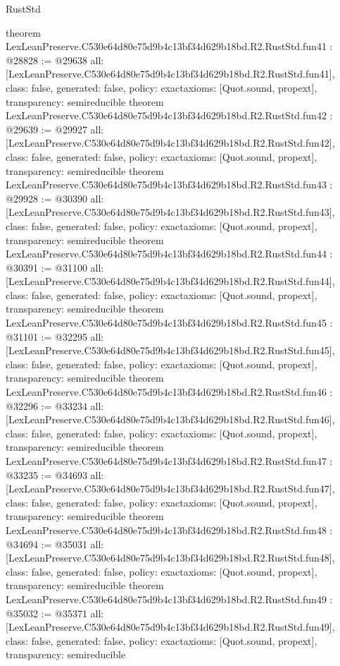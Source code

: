 \begin{lexlean}{RustStd}
\begin{coremodule}
{}
theorem LexLeanPreserve.C530e64d80e75d9b4c13bf34d629b18bd.R2.RustStd.fun41 : @28828 := @29638 {
  all: [LexLeanPreserve.C530e64d80e75d9b4c13bf34d629b18bd.R2.RustStd.fun41],
  class: false,
  generated: false,
  policy: exact{axioms: [Quot.sound, propext]},
  transparency: semireducible
}
theorem LexLeanPreserve.C530e64d80e75d9b4c13bf34d629b18bd.R2.RustStd.fun42 : @29639 := @29927 {
  all: [LexLeanPreserve.C530e64d80e75d9b4c13bf34d629b18bd.R2.RustStd.fun42],
  class: false,
  generated: false,
  policy: exact{axioms: [Quot.sound, propext]},
  transparency: semireducible
}
theorem LexLeanPreserve.C530e64d80e75d9b4c13bf34d629b18bd.R2.RustStd.fun43 : @29928 := @30390 {
  all: [LexLeanPreserve.C530e64d80e75d9b4c13bf34d629b18bd.R2.RustStd.fun43],
  class: false,
  generated: false,
  policy: exact{axioms: [Quot.sound, propext]},
  transparency: semireducible
}
theorem LexLeanPreserve.C530e64d80e75d9b4c13bf34d629b18bd.R2.RustStd.fun44 : @30391 := @31100 {
  all: [LexLeanPreserve.C530e64d80e75d9b4c13bf34d629b18bd.R2.RustStd.fun44],
  class: false,
  generated: false,
  policy: exact{axioms: [Quot.sound, propext]},
  transparency: semireducible
}
theorem LexLeanPreserve.C530e64d80e75d9b4c13bf34d629b18bd.R2.RustStd.fun45 : @31101 := @32295 {
  all: [LexLeanPreserve.C530e64d80e75d9b4c13bf34d629b18bd.R2.RustStd.fun45],
  class: false,
  generated: false,
  policy: exact{axioms: [Quot.sound, propext]},
  transparency: semireducible
}
theorem LexLeanPreserve.C530e64d80e75d9b4c13bf34d629b18bd.R2.RustStd.fun46 : @32296 := @33234 {
  all: [LexLeanPreserve.C530e64d80e75d9b4c13bf34d629b18bd.R2.RustStd.fun46],
  class: false,
  generated: false,
  policy: exact{axioms: [Quot.sound, propext]},
  transparency: semireducible
}
theorem LexLeanPreserve.C530e64d80e75d9b4c13bf34d629b18bd.R2.RustStd.fun47 : @33235 := @34693 {
  all: [LexLeanPreserve.C530e64d80e75d9b4c13bf34d629b18bd.R2.RustStd.fun47],
  class: false,
  generated: false,
  policy: exact{axioms: [Quot.sound, propext]},
  transparency: semireducible
}
theorem LexLeanPreserve.C530e64d80e75d9b4c13bf34d629b18bd.R2.RustStd.fun48 : @34694 := @35031 {
  all: [LexLeanPreserve.C530e64d80e75d9b4c13bf34d629b18bd.R2.RustStd.fun48],
  class: false,
  generated: false,
  policy: exact{axioms: [Quot.sound, propext]},
  transparency: semireducible
}
theorem LexLeanPreserve.C530e64d80e75d9b4c13bf34d629b18bd.R2.RustStd.fun49 : @35032 := @35371 {
  all: [LexLeanPreserve.C530e64d80e75d9b4c13bf34d629b18bd.R2.RustStd.fun49],
  class: false,
  generated: false,
  policy: exact{axioms: [Quot.sound, propext]},
  transparency: semireducible
}
\end{coremodule}
\end{lexlean}
